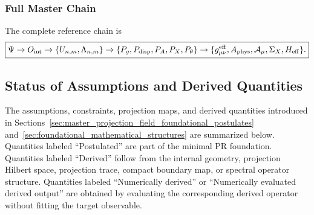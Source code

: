 \documentclass[11pt]{article}
\renewcommand{\arraystretch}{1.22}
\renewcommand{\arraystretch}{1.4}
\begin{document}
\subsubsection{Full Master Chain}
\label{app:full-master-chain}

The complete reference chain is
\begin{equation}
\boxed{
\Psi
\rightarrow
O_{\rm int}
\rightarrow
\{U_{n,m},\Lambda_{n,m}\}
\rightarrow
\{P_g,P_{\rm disp},P_A,P_X,P_\theta\}
\rightarrow
\{g_{\mu\nu}^{\rm eff},A_{\rm phys},\mathcal A_\mu,\Sigma_X,H_{\rm eff}\}.
}
\end{equation}

\subsection{Status of Assumptions and Derived Quantities}
\label{app:status}

The assumptions, constraints, projection maps, and derived quantities introduced in Sections~\ref{sec:master_projection_field_foundational_postulates} and~\ref{sec:foundational_mathematical_structures} are summarized below. Quantities labeled ``Postulated'' are part of the minimal PR foundation. Quantities labeled ``Derived'' follow from the internal geometry, projection Hilbert space, projection trace, compact boundary map, or spectral operator structure. Quantities labeled ``Numerically derived'' or ``Numerically evaluated derived output'' are obtained by evaluating the corresponding derived operator without fitting the target observable.

\providecommand{\tblcell}[1]{\begin{minipage}[t]{\linewidth}\raggedright #1\end{minipage}}

\begingroup
\small
\setlength{\tabcolsep}{3pt}
\renewcommand{\arraystretch}{1.28}
\end{document}
